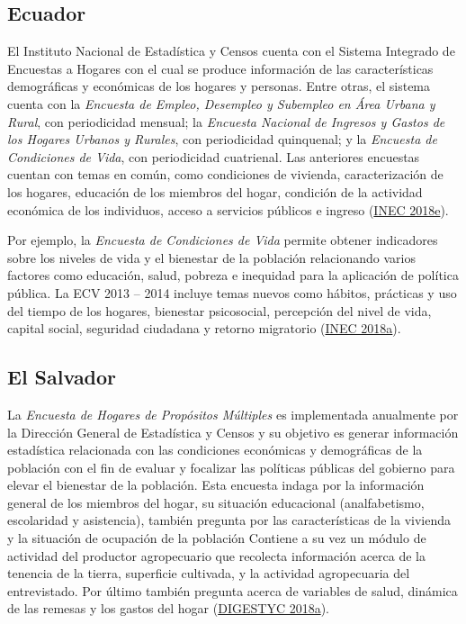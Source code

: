 \documentclass[
  12pt,
  spanish,
]{book}
\begin{document}
\hypertarget{ecuador}{%
\subsection*{Ecuador}\label{ecuador}}

El Instituto Nacional de Estadística y Censos cuenta con el Sistema Integrado de Encuestas a Hogares con el cual se produce información de las características demográficas y económicas de los hogares y personas. Entre otras, el sistema cuenta con la \emph{Encuesta de Empleo, Desempleo y Subempleo en Área Urbana y Rural}, con periodicidad mensual; la \emph{Encuesta Nacional de Ingresos y Gastos de los Hogares Urbanos y Rurales}, con periodicidad quinquenal; y la \emph{Encuesta de Condiciones de Vida}, con periodicidad cuatrienal. Las anteriores encuestas cuentan con temas en común, como condiciones de vivienda, caracterización de los hogares, educación de los miembros del hogar, condición de la actividad económica de los individuos, acceso a servicios públicos e ingreso (\protect\hyperlink{ref-INEC-EC}{INEC 2018e}).

Por ejemplo, la \emph{Encuesta de Condiciones de Vida} permite obtener indicadores sobre los niveles de vida y el bienestar de la población relacionando varios factores como educación, salud, pobreza e inequidad para la aplicación de política pública. La ECV 2013 -- 2014 incluye temas nuevos como hábitos, prácticas y uso del tiempo de los hogares, bienestar psicosocial, percepción del nivel de vida, capital social, seguridad ciudadana y retorno migratorio (\protect\hyperlink{ref-INEC2-EC}{INEC 2018a}).

\hypertarget{el-salvador}{%
\subsection*{El Salvador}\label{el-salvador}}

La \emph{Encuesta de Hogares de Propósitos Múltiples} es implementada anualmente por la Dirección General de Estadística y Censos y su objetivo es generar información estadística relacionada con las condiciones económicas y demográficas de la población con el fin de evaluar y focalizar las políticas públicas del gobierno para elevar el bienestar de la población. Esta encuesta indaga por la información general de los miembros del hogar, su situación educacional (analfabetismo, escolaridad y asistencia), también pregunta por las características de la vivienda y la situación de ocupación de la población Contiene a su vez un módulo de actividad del productor agropecuario que recolecta información acerca de la tenencia de la tierra, superficie cultivada, y la actividad agropecuaria del entrevistado. Por último también pregunta acerca de variables de salud, dinámica de las remesas y los gastos del hogar (\protect\hyperlink{ref-DIGESTYC-SV}{DIGESTYC 2018a}).
\end{document}
